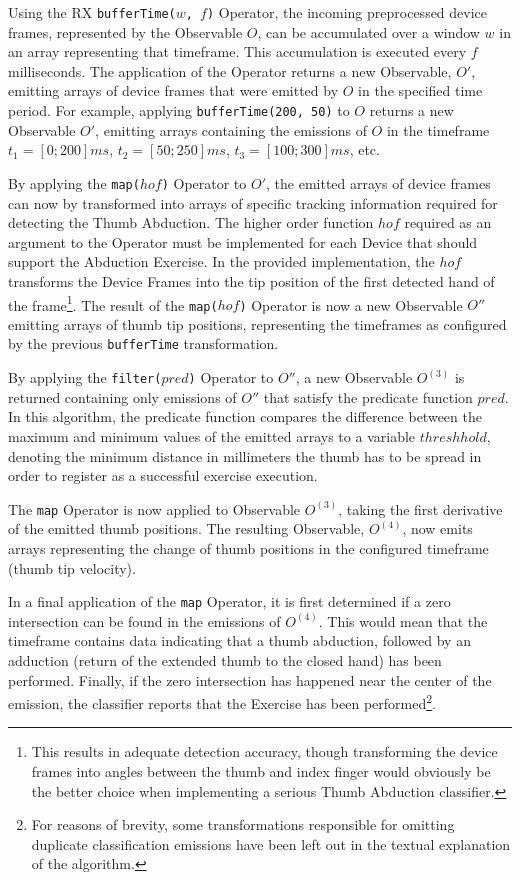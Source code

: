Using the \gls{RX} \texttt{bufferTime($w$, $f$)} Operator, the incoming preprocessed device frames, represented by the Observable $O$, can be accumulated over a window $w$ in an array representing that timeframe. This accumulation is executed every $f$ milliseconds. The application of the Operator returns a new Observable, $O'$, emitting arrays of device frames that were emitted by $O$ in the specified time period. For example, applying \texttt{bufferTime(200, 50)} to $O$ returns a new Observable $O'$, emitting arrays containing the emissions of $O$ in the timeframe $t_1 = [0; 200] ms$, $t_2 = [50; 250] ms$, $t_3 = [100; 300] ms$, etc.

By applying the \texttt{map($hof$)} Operator to $O'$, the emitted arrays of device frames can now by transformed into arrays of specific tracking information required for detecting the Thumb Abduction. The higher order function $hof$ required as an argument to the Operator must be implemented for each Device that should support the Abduction Exercise. In the provided implementation, the $hof$ transforms the Device Frames into the tip position of the first detected hand of the frame\footnote{This results in adequate detection accuracy, though transforming the device frames into angles between the thumb and index finger would obviously be the better choice when implementing a serious Thumb Abduction classifier.}. The result of the \texttt{map($hof$)} Operator is now a new Observable $O''$ emitting arrays of thumb tip positions, representing the timeframes as configured by the previous \texttt{bufferTime} transformation.

By applying the \texttt{filter($pred$)} Operator to $O''$, a new Observable $O^{(3)}$ is returned containing only emissions of $O''$ that satisfy the predicate function $pred$. In this algorithm, the predicate function compares the difference between the maximum and minimum values of the emitted arrays to a variable $threshhold$, denoting the minimum distance in millimeters the thumb has to be spread in order to register as a successful exercise execution.

The \texttt{map} Operator is now applied to Observable $O^{(3)}$, taking the first derivative of the emitted thumb positions. The resulting Observable, $O^{(4)}$, now emits arrays representing the change of thumb positions in the configured timeframe (thumb tip velocity).

In a final application of the \texttt{map} Operator, it is first determined if a zero intersection can be found in the emissions of $O^{(4)}$. This would mean that the timeframe contains data indicating that a thumb abduction, followed by an adduction (return of the extended thumb to the closed hand) has been performed. Finally, if the zero intersection has happened near the center of the emission, the classifier reports that the Exercise has been performed\footnote{For reasons of brevity, some transformations responsible for omitting duplicate classification emissions have been left out in the textual explanation of the algorithm.}.

